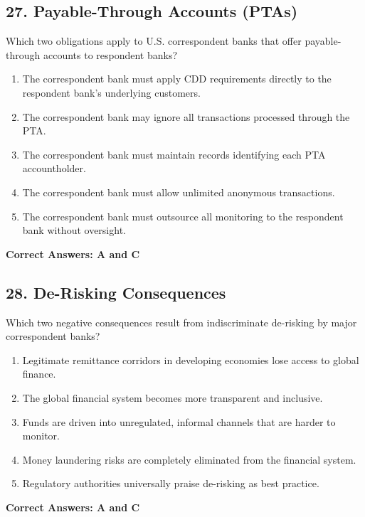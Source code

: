 \documentclass[11pt,a4paper]{article}
\begin{document}
	\subsection{27. Payable-Through Accounts (PTAs)}
	Which two obligations apply to U.S. correspondent banks that offer payable-through accounts to respondent banks?
	\begin{enumerate}[label=\Alph*.]
		\item The correspondent bank must apply CDD requirements directly to the respondent bank's underlying customers.
		\item The correspondent bank may ignore all transactions processed through the PTA.
		\item The correspondent bank must maintain records identifying each PTA accountholder.
		\item The correspondent bank must allow unlimited anonymous transactions.
		\item The correspondent bank must outsource all monitoring to the respondent bank without oversight.
	\end{enumerate}
	\textbf{Correct Answers: A and C}
	
	\subsection{28. De-Risking Consequences}
	Which two negative consequences result from indiscriminate de-risking by major correspondent banks?
	\begin{enumerate}[label=\Alph*.]
		\item Legitimate remittance corridors in developing economies lose access to global finance.
		\item The global financial system becomes more transparent and inclusive.
		\item Funds are driven into unregulated, informal channels that are harder to monitor.
		\item Money laundering risks are completely eliminated from the financial system.
		\item Regulatory authorities universally praise de-risking as best practice.
	\end{enumerate}
	\textbf{Correct Answers: A and C}
	
\end{document}
